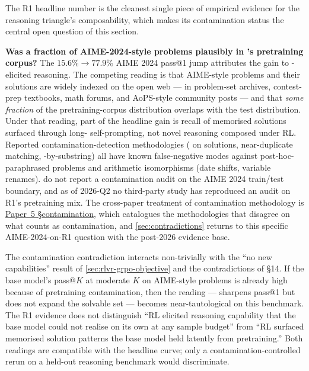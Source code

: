 The R1 headline number is the cleanest single piece of empirical
evidence for the reasoning triangle's composability, which makes its
contamination status the central open question of this section.

\begin{contradiction}
\textbf{Was a fraction of AIME-2024-style problems plausibly in
's pretraining corpus?} The $15.6\%\!\to\!77.9\%$ AIME 2024
pass@1 jump \citep[\S 2.3]{deepseek-r1} attributes the gain to
-elicited reasoning. The competing reading is that AIME-style
problems and their solutions are widely indexed on the open web ---
in problem-set archives, contest-prep textbooks, math forums, and
AoPS-style community posts --- and that \emph{some fraction} of the
pretraining-corpus distribution overlaps with the test
distribution. Under that reading, part of the headline gain is
recall of memorised solutions surfaced through long-
self-prompting, not novel reasoning composed under RL. Reported
contamination-detection methodologies ( on solutions,
near-duplicate matching, -by-substring) all have
known false-negative modes against post-hoc-paraphrased problems and
arithmetic isomorphisms (date shifts, variable renames). \citet{deepseek-r1}
do not report a contamination audit on the AIME 2024 train/test
boundary, and as of 2026-Q2 no third-party study has reproduced an
audit on R1's pretraining mix. The cross-paper treatment of
contamination methodology is \hyperref[P5-sec:contamination]{Paper~5 §contamination}, which catalogues
the methodologies that disagree on what counts as contamination, and
\cref{sec:contradictions} returns to this specific
AIME-2024-on-R1 question with the post-2026 evidence base.
\end{contradiction}

The contamination contradiction interacts non-trivially with the
\citet{rlvr-limits-2025} ``no new capabilities'' result of
\cref{sec:rlvr-grpo-objective} and the contradictions of §14. If the
base model's pass@$K$ at moderate $K$ on AIME-style problems is
already high because of pretraining contamination, then the
\citeauthor{rlvr-limits-2025} reading ---  sharpens pass@1 but
does not expand the solvable set --- becomes near-tautological on
this benchmark. The R1 evidence does not distinguish ``RL elicited
reasoning capability that the base model could not realise on its
own at any sample budget'' from ``RL surfaced memorised solution
patterns the base model held latently from pretraining.'' Both
readings are compatible with the headline curve; only a
contamination-controlled rerun on a held-out reasoning benchmark
would discriminate.

